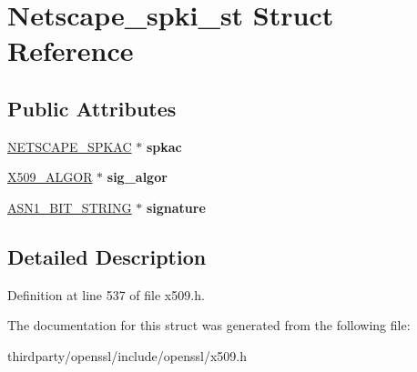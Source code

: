 \hypertarget{struct_netscape__spki__st}{}\section{Netscape\+\_\+spki\+\_\+st Struct Reference}
\label{struct_netscape__spki__st}
\subsection*{Public Attributes}
\begin{DoxyCompactItemize}
\item 
\mbox{\label{struct_netscape__spki__st_a724664bfc3a3f03a4f8238be98807283}} 
\hyperlink{struct_netscape__spkac__st}{N\+E\+T\+S\+C\+A\+P\+E\+\_\+\+S\+P\+K\+AC} $\ast$ {\bfseries spkac}
\item 
\mbox{\label{struct_netscape__spki__st_a490105a4ef783d32f79fd00f72f8aa62}} 
\hyperlink{struct_x509__algor__st}{X509\+\_\+\+A\+L\+G\+OR} $\ast$ {\bfseries sig\+\_\+algor}
\item 
\mbox{\label{struct_netscape__spki__st_a8fe9d3a3731234862a6ea254e206140e}} 
\hyperlink{structasn1__string__st}{A\+S\+N1\+\_\+\+B\+I\+T\+\_\+\+S\+T\+R\+I\+NG} $\ast$ {\bfseries signature}
\end{DoxyCompactItemize}


\subsection{Detailed Description}


Definition at line 537 of file x509.\+h.



The documentation for this struct was generated from the following file\+:\begin{DoxyCompactItemize}
\item 
thirdparty/openssl/include/openssl/x509.\+h\end{DoxyCompactItemize}
